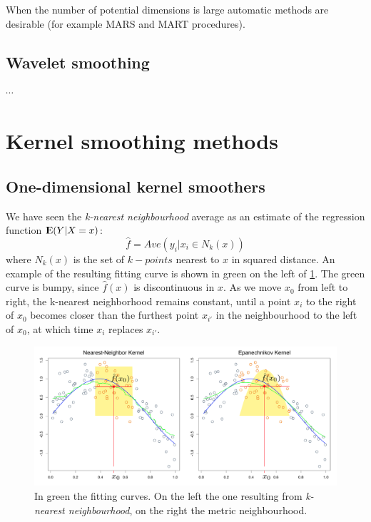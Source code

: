 \documentclass[12pt, letterpaper]{article}
\theoremstyle{definition}
\newcommand{\E}{{\rm I\kern-.3em E}}
\begin{document}
When the number of potential dimensions is large automatic methods are desirable (for example MARS and MART procedures).
\subsection{Wavelet smoothing}
$\cdots$
\section{Kernel smoothing methods}
\subsection{One-dimensional kernel smoothers}
We have seen the \textit{k-nearest neighbourhood} average as an estimate of the regression function $\E(Y|X=x)$:
\begin{equation}
\hat{f} = Ave(y_i|x_i\in N_k(x))
\end{equation}
where $N_k(x)$ is the set of $k-points$ nearest to $x$ in squared distance. An example of the resulting fitting curve is shown in green on the left of \ref{nearest}. The green curve is bumpy, since $\hat{f}(x)$ is discontinuous in $x$. As we move $x_0$ from left to right, the k-nearest neighborhood remains constant, until a point $x_i$ to the right of $x_0$ becomes closer than the furthest point $x_{i'}$ in the neighbourhood to the left of $x_0$, at which time $x_i$ replaces $x_{i'}$. 
\begin{figure}
\centering
\includegraphics[scale=0.38]{img/nearest}
\caption{In green the fitting curves. On the left the one resulting from \textit{k-nearest neighbourhood}, on the right the metric neighbourhood.}
\label{nearest}
\end{figure}
\end{document}
